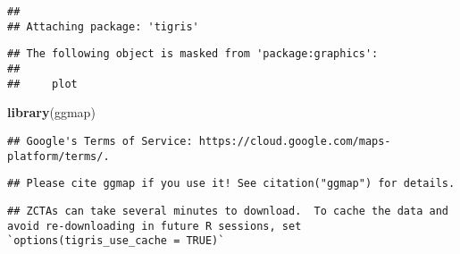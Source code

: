 \documentclass[]{article}
\newenvironment{Shaded}{\begin{snugshade}}{\end{snugshade}}
\newcommand{\KeywordTok}[1]{\textcolor[rgb]{0.13,0.29,0.53}{\textbf{#1}}}
\newcommand{\DataTypeTok}[1]{\textcolor[rgb]{0.13,0.29,0.53}{#1}}
\newcommand{\StringTok}[1]{\textcolor[rgb]{0.31,0.60,0.02}{#1}}
\newcommand{\CommentTok}[1]{\textcolor[rgb]{0.56,0.35,0.01}{\textit{#1}}}
\newcommand{\OperatorTok}[1]{\textcolor[rgb]{0.81,0.36,0.00}{\textbf{#1}}}
\newcommand{\NormalTok}[1]{#1}
\begin{document}
\begin{verbatim}
## 
## Attaching package: 'tigris'
\end{verbatim}

\begin{verbatim}
## The following object is masked from 'package:graphics':
## 
##     plot
\end{verbatim}

\begin{Shaded}
\begin{Highlighting}[]
\KeywordTok{library}\NormalTok{(ggmap)}
\end{Highlighting}
\end{Shaded}

\begin{verbatim}
## Google's Terms of Service: https://cloud.google.com/maps-platform/terms/.
\end{verbatim}

\begin{verbatim}
## Please cite ggmap if you use it! See citation("ggmap") for details.
\end{verbatim}

\begin{Shaded}
\end{Shaded}

\begin{verbatim}
## ZCTAs can take several minutes to download.  To cache the data and avoid re-downloading in future R sessions, set `options(tigris_use_cache = TRUE)`
\end{verbatim}
\end{document}
